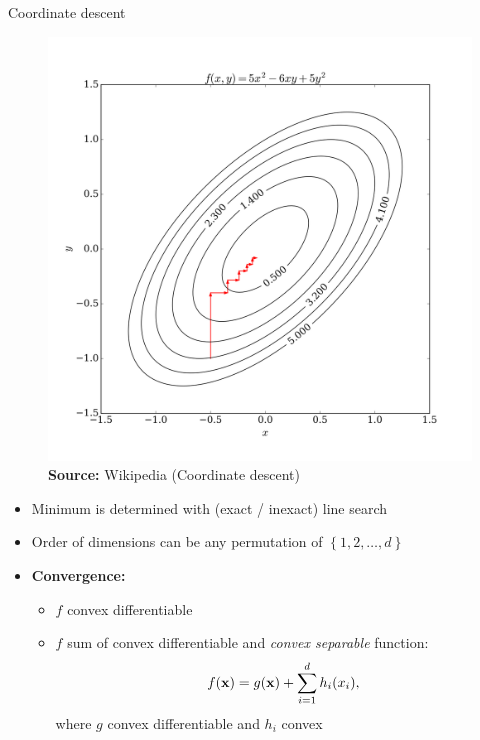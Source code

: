 \documentclass[11pt,compress,t,notes=noshow, xcolor=table]{beamer}
\begin{document}
\begin{vbframe}{Coordinate descent}
\begin{figure}
    \centering
    \includegraphics[height=0.45\textheight,keepaspectratio]{figure_man/Coordinate_descent.png}
    \caption*{\small \textbf{Source:} Wikipedia (Coordinate descent)}
\end{figure}

\framebreak

\begin{itemize}
    \item Minimum is determined with (exact / inexact) line search
    \item Order of dimensions can be any permutation of $\left\{1,2,\ldots,d\right\}$
    \item \textbf{Convergence:}
        \begin{itemize}
            \item $f$ convex differentiable
            \item $f$ sum of convex differentiable and \textit{convex separable} function:
                \begin{equation*}
                    f(\mathbf{x}) = g(\mathbf{x}) + \sum_{i=1}^d h_i(x_i),
                \end{equation*}
                where $g$ convex differentiable and $h_i$ convex
        \end{itemize}
\end{itemize}


\end{vbframe}
\end{document}
